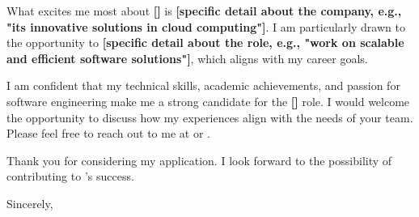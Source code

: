 \documentclass[10pt]{article}
\begin{document}
What excites me most about \textbf{[\company]} is \textbf{[specific detail about the company, e.g., "its innovative solutions in cloud computing"]}. I am particularly drawn to the opportunity to \textbf{[specific detail about the role, e.g., "work on scalable and efficient software solutions"]}, which aligns with my career goals.

I am confident that my technical skills, academic achievements, and passion for software engineering make me a strong candidate for the \textbf{[\position]} role. I would welcome the opportunity to discuss how my experiences align with the needs of your team. Please feel free to reach out to me at \href{tel:+15149445977}{\phone} \space or \href{mailto:\email}{\email}.

\vspace{1.5em}
Thank you for considering my application. I look forward to the possibility of contributing to \company's success.

\vspace{2em}
Sincerely, \\
\fullname
\end{document}
